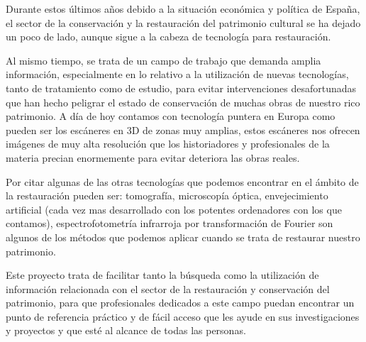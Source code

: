 Durante estos últimos años debido a la situación económica y política de España, el sector de la conservación y la restauración del patrimonio cultural se ha dejado un poco de lado, aunque sigue a la cabeza de tecnología para restauración. 

Al mismo tiempo, se trata de un campo de trabajo que demanda amplia información, especialmente en lo relativo a la utilización de nuevas tecnologías, tanto de tratamiento como de estudio, para evitar intervenciones desafortunadas que han hecho peligrar el estado de conservación de muchas obras de nuestro rico patrimonio. A día de hoy contamos con tecnología puntera en Europa como pueden ser los escáneres en 3D de zonas muy amplias, estos escáneres nos ofrecen imágenes de muy alta resolución que los historiadores y profesionales de la materia precian enormemente para evitar deteriora las obras reales.

Por citar algunas de las otras tecnologías que podemos encontrar en el ámbito de la restauración pueden ser: tomografía, microscopía óptica, envejecimiento artificial (cada vez mas desarrollado con los potentes ordenadores con los que contamos), espectrofotometría infrarroja por transformación de Fourier son algunos de los métodos que podemos aplicar cuando se trata de restaurar nuestro patrimonio. 

Este proyecto trata de facilitar tanto la búsqueda como la utilización de información relacionada con el sector de la restauración y conservación del patrimonio, para que profesionales dedicados a este campo puedan encontrar un punto de referencia práctico y de fácil acceso que les ayude en sus investigaciones y proyectos y que esté al alcance de todas las personas. 

